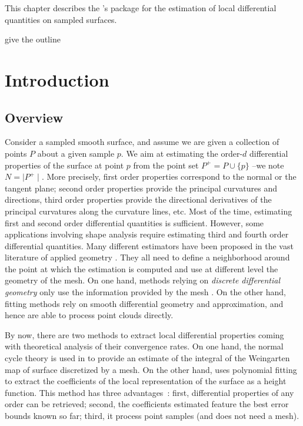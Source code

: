 \newcommand{\hot}[0]{h.o.t}

This chapter describes the \cgal's package for the estimation of local 
differential quantities on sampled surfaces. 

give the outline
 
\section{Introduction}
\label{sec:intro}

\subsection{Overview}

Consider a sampled smooth surface, and assume we are given a
collection of points $P$ about a given sample $p$. We aim at
estimating the order-$d$ differential properties of the surface at
point $p$ from the point set $P^+ = P\cup \{ p\}$ --we note $N=\mid
P^+\mid$. More precisely, first order properties correspond to the
normal or the tangent plane; second order properties provide the
principal curvatures and directions, third order properties provide
the directional derivatives of the principal curvatures along the
curvature lines, etc.  Most of the time, estimating first and second
order differential quantities is sufficient.  However, some
applications involving shape analysis require estimating third and
fourth order differential quantities.
Many different estimators have been proposed in the vast literature of
applied geometry \cite{sp-smrqtm-01}. They all need to define a
neighborhood around the point at which the estimation is computed and
use at different level the geometry of the mesh. On one hand, methods
relying on {\em discrete differential geometry} only use the
information provided by the mesh
\cite{pinkall93a,desbrun00a,dcs-jmm-rdtnc-03}. On the other hand,
fitting methods rely on smooth differential geometry and
approximation, and hence are able to process point clouds directly.

By now, there are two methods to extract local differential properties
coming with theoretical analysis of their convergence rates. On one
hand, the normal cycle theory is used in
\cite{dcs-jmm-rdtnc-03} to provide an estimate of the integral of the
Weingarten map of surface discretized by a mesh.  On the other hand,
\cite{fc-mp-edqpfoj-05} uses polynomial fitting to extract the
coefficients of the local representation of the surface as a height
function. This method has three advantages~: first, differential
properties of any order can be retrieved; second, the coefficients
estimated feature the best error bounds known so far; third, it
process point samples (and does not need a mesh).



